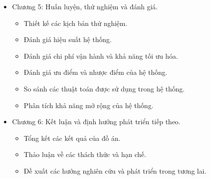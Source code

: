 \begin{itemize}
    \item Chương 5: Huấn luyện, thử nghiệm và đánh giá.
          \begin{itemize}
              \item Thiết kế các kịch bản thử nghiệm.
              \item Đánh giá hiệu suất hệ thống.
              \item Đánh giá chi phí vận hành và khả năng tối ưu hóa.
              \item Đánh giá ưu điểm và nhược điểm của hệ thống.
              \item So sánh các thuật toán được sử dụng trong hệ thống.
              \item Phân tích khả năng mở rộng của hệ thống.
          \end{itemize}

    \item Chương 6: Kết luận và định hướng phát triển tiếp theo.
          \begin{itemize}
              \item Tổng kết các kết quả của đồ án.
              \item Thảo luận về các thách thức và hạn chế.
              \item Đề xuất các hướng nghiên cứu và phát triển trong tương lai.
          \end{itemize}
\end{itemize}